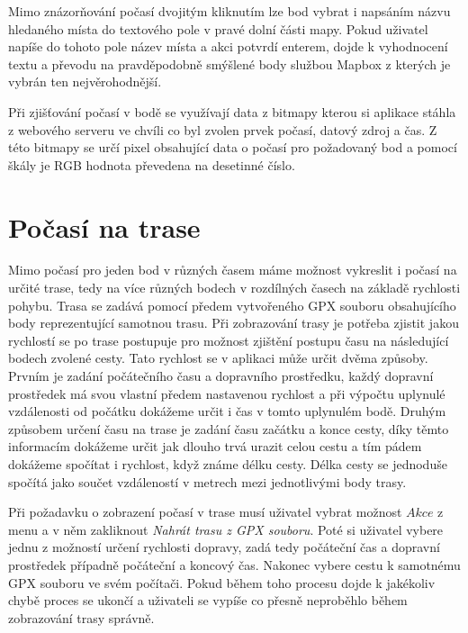 \documentclass[czech,bachelor,dept460,male,csharp,cpdeclaration]{diploma}
\begin{document}
	Mimo znázorňování počasí dvojitým kliknutím lze bod vybrat i napsáním názvu hledaného místa do textového pole v pravé dolní části mapy. Pokud uživatel napíše do tohoto pole název místa a akci potvrdí enterem, dojde k vyhodnocení textu a převodu na pravděpodobně smýšlené body službou Mapbox \cite{mapbox} z kterých je vybrán ten nejvěrohodnější. 
	
	Při zjišťování počasí v bodě se využívají data z bitmapy kterou si aplikace stáhla z webového serveru ve chvíli co byl zvolen prvek počasí, datový zdroj a čas. Z této bitmapy se určí pixel obsahující data o počasí pro požadovaný bod a pomocí škály je RGB hodnota převedena na desetinné číslo.
	
	\section{Počasí na trase}
	
	Mimo počasí pro jeden bod v různých časem máme možnost vykreslit i počasí na určité trase, tedy na více různých bodech v rozdílných časech na základě rychlosti pohybu. Trasa se zadává pomocí předem vytvořeného GPX souboru obsahujícího body reprezentující samotnou trasu. Při zobrazování trasy je potřeba zjistit jakou rychlostí se po trase postupuje pro možnost zjištění postupu času na následující bodech zvolené cesty. Tato rychlost se v aplikaci může určit dvěma způsoby. Prvním je zadání počátečního času a dopravního prostředku, každý dopravní prostředek má svou vlastní předem nastavenou rychlost a při výpočtu uplynulé vzdálenosti od počátku dokážeme určit i čas v tomto uplynulém bodě. Druhým způsobem určení času na trase je zadání času začátku a konce cesty, díky těmto informacím dokážeme určit jak dlouho trvá urazit celou cestu a tím pádem dokážeme spočítat i rychlost, když známe délku cesty. Délka cesty se jednoduše spočítá jako součet vzdáleností v metrech mezi jednotlivými body trasy.
	
	Při požadavku o zobrazení počasí v trase musí uživatel vybrat možnost $Akce$ z menu a v něm zakliknout {\it Nahrát trasu z GPX souboru}. Poté si uživatel vybere jednu z možností určení rychlosti dopravy, zadá tedy počáteční čas a dopravní prostředek případně počáteční a koncový čas. Nakonec vybere cestu k samotnému GPX souboru ve svém počítači. Pokud během toho procesu dojde k jakékoliv chybě proces se ukončí a uživateli se vypíše co přesně neproběhlo během zobrazování trasy správně.
	
\end{document}
